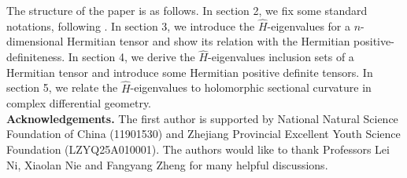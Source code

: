 \documentclass[10pt,reqno]{amsart}
\theoremstyle{definition}
\begin{document}
The structure of the paper is as follows. In section 2, we fix some standard notations, following \cite{QL}. In section 3, we introduce the $\hat{H}$-eigenvalues for a $n$-dimensional Hermitian tensor and show its relation with the Hermitian positive-definiteness. In section 4, we derive the $\hat{H}$-eigenvalues inclusion sets of a Hermitian tensor and introduce some Hermitian positive definite tensors. In section 5, we relate the $\hat{H}$-eigenvalues to holomorphic sectional curvature in complex differential geometry.\\


\noindent\textbf{Acknowledgements.}  The first author is supported by National Natural Science Foundation of
China (11901530) and Zhejiang Provincial Excellent Youth Science Foundation (LZYQ25A010001). The authors would like to thank Professors Lei Ni, Xiaolan Nie and Fangyang Zheng for many helpful discussions. 
\end{document}
